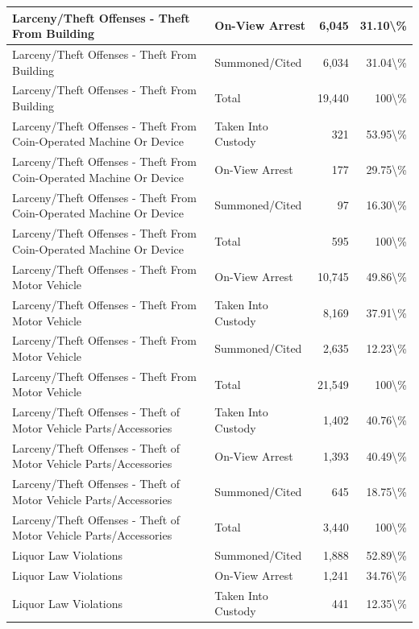 \documentclass[
]{krantz}
\begin{document}
\begin{longtable}[t]{l|l|r|r}
\hline
Larceny/Theft Offenses - Theft From Building & On-View Arrest & 6,045 & 31.10\textbackslash{}\%\\
\hline
Larceny/Theft Offenses - Theft From Building & Summoned/Cited & 6,034 & 31.04\textbackslash{}\%\\
\hline
Larceny/Theft Offenses - Theft From Building & Total & 19,440 & 100\textbackslash{}\%\\
\hline
Larceny/Theft Offenses - Theft From Coin-Operated Machine Or Device & Taken Into Custody & 321 & 53.95\textbackslash{}\%\\
\hline
Larceny/Theft Offenses - Theft From Coin-Operated Machine Or Device & On-View Arrest & 177 & 29.75\textbackslash{}\%\\
\hline
Larceny/Theft Offenses - Theft From Coin-Operated Machine Or Device & Summoned/Cited & 97 & 16.30\textbackslash{}\%\\
\hline
Larceny/Theft Offenses - Theft From Coin-Operated Machine Or Device & Total & 595 & 100\textbackslash{}\%\\
\hline
Larceny/Theft Offenses - Theft From Motor Vehicle & On-View Arrest & 10,745 & 49.86\textbackslash{}\%\\
\hline
Larceny/Theft Offenses - Theft From Motor Vehicle & Taken Into Custody & 8,169 & 37.91\textbackslash{}\%\\
\hline
Larceny/Theft Offenses - Theft From Motor Vehicle & Summoned/Cited & 2,635 & 12.23\textbackslash{}\%\\
\hline
Larceny/Theft Offenses - Theft From Motor Vehicle & Total & 21,549 & 100\textbackslash{}\%\\
\hline
Larceny/Theft Offenses - Theft of Motor Vehicle Parts/Accessories & Taken Into Custody & 1,402 & 40.76\textbackslash{}\%\\
\hline
Larceny/Theft Offenses - Theft of Motor Vehicle Parts/Accessories & On-View Arrest & 1,393 & 40.49\textbackslash{}\%\\
\hline
Larceny/Theft Offenses - Theft of Motor Vehicle Parts/Accessories & Summoned/Cited & 645 & 18.75\textbackslash{}\%\\
\hline
Larceny/Theft Offenses - Theft of Motor Vehicle Parts/Accessories & Total & 3,440 & 100\textbackslash{}\%\\
\hline
Liquor Law Violations & Summoned/Cited & 1,888 & 52.89\textbackslash{}\%\\
\hline
Liquor Law Violations & On-View Arrest & 1,241 & 34.76\textbackslash{}\%\\
\hline
Liquor Law Violations & Taken Into Custody & 441 & 12.35\textbackslash{}\%\\

\end{longtable}
\end{document}
